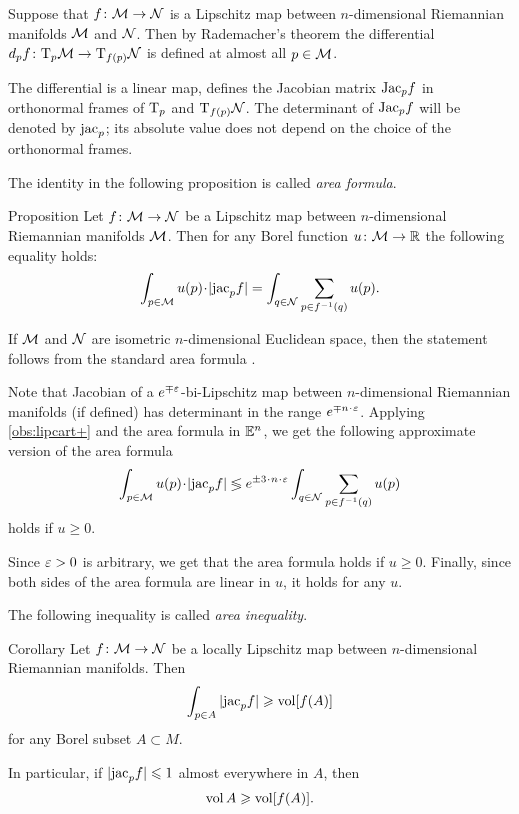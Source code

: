 Suppose that $f\colon\mathcal{M}\to\mathcal{N}$ is a Lipschitz map between $n$-dimensional Riemannian manifolds $\mathcal{M}$ and $\mathcal{N}$.
Then by Rademacher's theorem %
the differential $d_p f\colon\mathrm{T}_p\mathcal{M}\to\mathrm{T}_{f(p)}\mathcal{N}$ is defined at almost all $p\in \mathcal{M}$.

The differential is a linear map, defines the Jacobian matrix $\mathrm{Jac}_pf$ in orthonormal frames of $\mathrm{T}_p$ and $\mathrm{T}_{f(p)}\mathcal{N}$.
The determinant of $\mathrm{Jac}_pf$ will be denoted by $\mathrm{jac}_p$;
its absolute value does not depend on the choice of the orthonormal frames.

The identity in the following proposition is called \emph{area formula}.

\begin{thm}{Proposition}
Let $f\colon\mathcal{M}\to\mathcal{N}$ be a Lipschitz map between $n$-dimensional Riemannian manifolds $\mathcal{M}$.
Then for  any Borel function $u\:\spc{M}\z\to \RR$ the following equality holds:
\[\int_{p\in \spc{M}} u(p)\cdot |\jac_pf|=\int_{q\in \spc{N}}\sum_{p\in f^{-1}(q)} u(p).\]

\end{thm}

If $\mathcal{M}$ and $\mathcal{N}$ are isometric $n$-dimensional Euclidean space, then the statement follows from the standard area formula \cite[3.2.3]{federer}.

Note that Jacobian of a $e^{\mp\varepsilon}$-bi-Lipschitz map between $n$-dimensional Riemannian manifolds (if defined) has determinant in the range $e^{\mp n\cdot\eps}$.
Applying \ref{obs:lipcart+} and the area formula in $\mathbb{E}^n$, we get the following approximate version of the area formula 
\[\int_{p\in \spc{M}} u(p)\cdot |\jac_pf|
\lege e^{\pm 3\cdot n\cdot \eps}\int_{q\in \spc{N}}\sum_{p\in f^{-1}(q)} u(p)\]
holds if $u\ge0$.

Since $\varepsilon>0$ is arbitrary, we get that the area formula holds if $u\ge 0$.
Finally, since both sides of the area formula are linear in $u$, it holds for any $u$.
\qeds

The following inequality is called \emph{area inequality}.

\begin{thm}{Corollary}\label{cor:area-inequality}
Let $f\colon\mathcal{M}\to\mathcal{N}$ be a locally Lipschitz map between $n$-dimensional Riemannian manifolds.
Then 
\[\int_{p\in A} |\mathrm{jac}_p f|\geqslant \operatorname{\rm vol}\nolimits[f(A)]\]
for any Borel subset $A\subset M$.

In particular, if $|\mathrm{jac}_p f|\leqslant 1$ almost everywhere in $A$, then 
\[\operatorname{\rm vol}\nolimits A \geqslant \operatorname{\rm vol}\nolimits[f(A)].\]
\end{thm}

